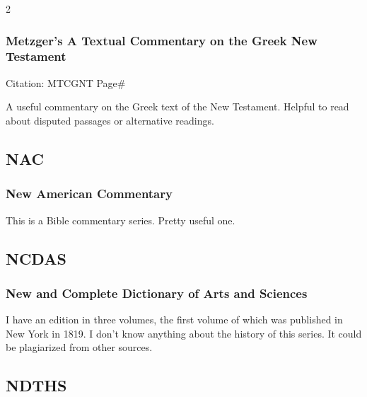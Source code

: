 \begin{multicols}{2}
		\subsubsection*{Metzger's A Textual Commentary on the Greek New Testament}
		
			Citation:
				MTCGNT Page\#
				
			A useful commentary on the Greek text of the New Testament. Helpful to read about disputed passages or alternative readings.
			
	\subsection*{NAC}
	
		\subsubsection*{New American Commentary}
		
			This is a Bible commentary series. Pretty useful one.
			
	\subsection*{NCDAS}
	
		\subsubsection*{New and Complete Dictionary of Arts and Sciences}
		
			I have an edition in three volumes, the first volume of which was published in New York in 1819. I don't know anything about the history of this series. It could be plagiarized from other sources.
			
	\subsection*{NDTHS}
	

\end{multicols}
